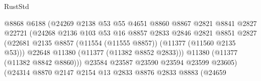 \begin{lexlean}{RustStd}
\begin{coremodule}
                                          @8868
                                          @6188
                                          (@24269
                                            @2138
                                            @53
                                            @55
                                            @4651
                                            @8860
                                            @8867
                                            @2821
                                            @8841
                                            @2827
                                            @22721
                                            (@24268
                                              @2136
                                              @103
                                              @53
                                              @16
                                              @8857
                                              @2833
                                              @2846
                                              @2821
                                              @8851
                                              @2827
                                              (@22681
                                                @2135
                                                @8857
                                                (@11554 (@11555 @8857))
                                                (@11377 (@11560 @2135 @53)))
                                              @22648
                                              @11380
                                              (@11377 (@11382 @8852 @2833)))
                                            @11380
                                            (@11377 (@11382 @8842 @8860)))
                                          @23584
                                          @23587
                                          @23590
                                          @23594
                                          @23599
                                          @23605)
                                        (@24314
                                          @8870
                                          @2147
                                          @2154
                                          @13
                                          @2833
                                          @8876
                                          @2833
                                          @8883
                                          (@24659

\end{coremodule}
\end{lexlean}
